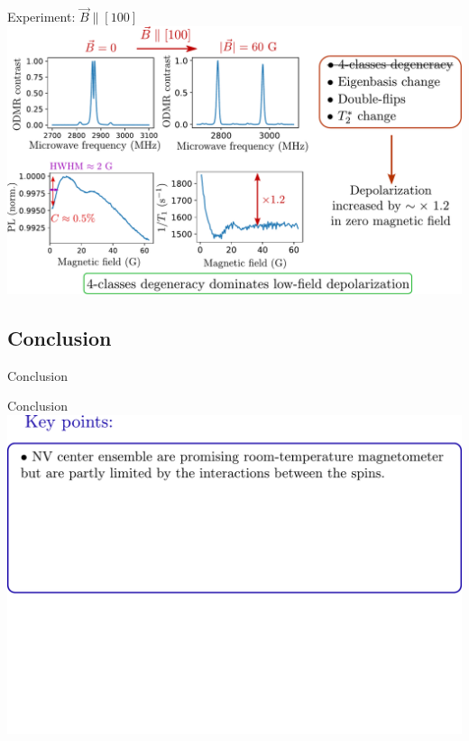 \documentclass{beamer}
\begin{document}
\begin{frame}{Experiment: $\vec B \parallel [100]$}
\centering
\includegraphics[width=\textwidth,height=0.85\textheight,keepaspectratio]{Slide_T1_PL_100_f}
\end{frame}

\subsection{Conclusion}

\begin{frame}{Conclusion}
\end{frame}

\begin{frame}{Conclusion}
\centering
\includegraphics[width=\textwidth,height=0.85\textheight,keepaspectratio]{Slide_CCL_f-4}
\end{frame}
\end{document}
